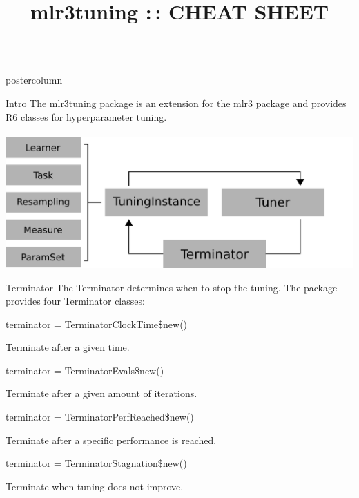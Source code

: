 \documentclass{beamer}
\title{mlr3tuning :\,: CHEAT SHEET} %
\newlength{\columnheight} %
\begin{document}
\begin{frame}[fragile]{}
	\begin{columns}
		\begin{column}{.245\textwidth}
			\begin{beamercolorbox}[center]{postercolumn}
				\begin{minipage}{.98\textwidth}
					\parbox[t][\columnheight]{\textwidth}{
						\begin{myblock}{Intro}
							The mlr3tuning package is an extension for the \href{https://github.com/mlr-org/mlr3}{mlr3} package and provides R6 classes for hyperparameter tuning.
							\\
							\\
							\includegraphics[width=\textwidth]{img/tuning_objects.png}
						\end{myblock}
					\begin{myblock}{Terminator}
						The Terminator determines when to stop the tuning. The package provides four Terminator classes:
						\\
						\begin{codebox}
							terminator = TerminatorClockTime\$new()
						\end{codebox}
						Terminate after a given time.
						\\
						\begin{codebox}
							terminator = TerminatorEvals\$new()
						\end{codebox}
						Terminate after a given amount of iterations. 
						\\
						\begin{codebox}
							terminator = TerminatorPerfReached\$new()
						\end{codebox}
						Terminate after a specific performance is reached.  
						\\
						\begin{codebox}
							terminator = TerminatorStagnation\$new()
						\end{codebox}
						Terminate when tuning does not improve.

\end{myblock}}
\end{minipage}
\end{beamercolorbox}
\end{column}
\end{columns}
\end{frame}
\end{document}
